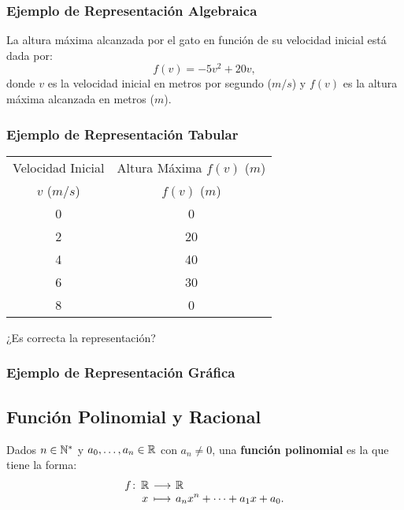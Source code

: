 \documentclass[a4,11pt]{aleph-notas}
\begin{document}
\subsubsection*{Ejemplo de Representación Algebraica}  
La altura máxima alcanzada por el gato en función de su velocidad inicial está dada por:  
\[
    f(v) = -5v^2 + 20v,
\]
donde \(v\) es la velocidad inicial en metros por segundo (\(m/s\)) y \(f(v)\) es la altura máxima alcanzada en metros (\(m\)).

\subsubsection*{Ejemplo de Representación Tabular}  
\begin{center}\small
\begin{tabular}{@{}cc@{}}
\toprule
Velocidad Inicial  & Altura Máxima \(f(v)\) (\(m\)) \\
\(v\) (\(m/s\)) & \(f(v)\) (\(m\))\\
\midrule
0 & 0 \\
2 & 20 \\
4 & 40 \\
6 & 30 \\
8 & 0 \\
\bottomrule
\end{tabular}
\end{center}
¿Es correcta la representación?

\subsubsection*{Ejemplo de Representación Gráfica}  
\begin{center}
\end{center}

\subsection*{Función Polinomial y Racional}

\begin{defi}
    Dados $n\in \mathbb{N}^*$ y $a_0,\ldots,a_n\in\mathbb{R}$ con $a_n\neq 0$, una \textbf{función polinomial} es la que tiene la forma:
    \[
        \funcion{f}{\R}{\R}{x}{a_nx^n+\cdots+ a_1x+a_0.}
    \]
\end{defi}
\end{document}
